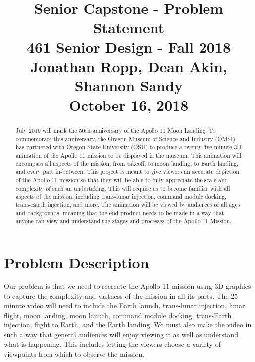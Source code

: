 \documentclass[onecolumn, draftclsnofoot,10pt, compsoc]{IEEEtran}
\begin{document}
\title{Senior Capstone - Problem Statement\\
	\large 461 Senior Design - Fall 2018\\
	\large Jonathan Ropp, Dean Akin, Shannon Sandy\\
	\large October 16, 2018}

\maketitle

\begin{abstract}

July 2019 will mark the 50th anniversary of the Apollo 11 Moon Landing. To commemorate this anniversary, the Oregon Museum of Science and Industry (OMSI) has partnered with Oregon State University (OSU) to produce a twenty-five-minute 3D animation of the Apollo 11 mission to be displayed in the museum. This animation will encompass all aspects of the mission, from takeoff, to moon landing, to Earth landing, and every part in-between. This project is meant to give viewers an accurate depiction of the Apollo 11 mission so that they will be able to fully appreciate the scale and complexity of such an undertaking. This will require us to become familiar with all aspects of the mission, including trans-lunar injection, command module docking, trans-Earth injection, and more. The animation will be viewed by audiences of all ages and backgrounds, meaning that the end product needs to be made in a way that anyone can view and understand the stages and processes of the Apollo 11 Mission.

\end{abstract}

\newpage

\section{Problem Description}
Our problem is that we need to recreate the Apollo 11 mission using 3D graphics to capture the complexity and vastness of the mission in all its parts. The 25 minute video will need to include the Earth launch, trans-lunar injection, lunar flight, moon landing, moon launch, command module docking, trans-Earth injection, flight to Earth, and the Earth landing. We must also make the video in such a way that general audiences will enjoy viewing it as well as understand what is happening. This includes letting the viewers choose a variety of viewpoints from which to observe the mission.
\end{document}
